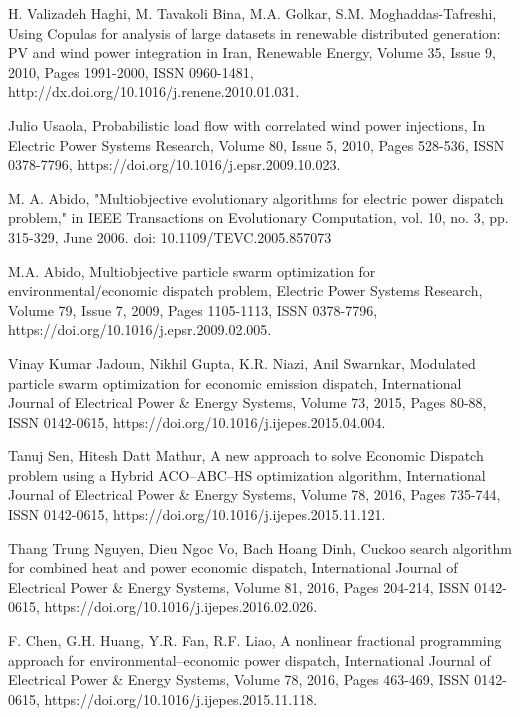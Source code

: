\begin{thebibliography}{99}
\begin{singlespace}
H. Valizadeh Haghi, M. Tavakoli Bina, M.A. Golkar, S.M. Moghaddas-Tafreshi, Using Copulas for analysis of large datasets in renewable distributed generation: PV and wind power integration in Iran, Renewable Energy, Volume 35, Issue 9, 2010, Pages 1991-2000, ISSN 0960-1481, http://dx.doi.org/10.1016/j.renene.2010.01.031.

Julio Usaola, Probabilistic load flow with correlated wind power injections, In Electric Power Systems Research, Volume 80, Issue 5, 2010, Pages 528-536, ISSN 0378-7796, https://doi.org/10.1016/j.epsr.2009.10.023.

 M. A. Abido, "Multiobjective evolutionary algorithms for electric power dispatch problem," in IEEE Transactions on Evolutionary Computation, vol. 10, no. 3, pp. 315-329, June 2006.
doi: 10.1109/TEVC.2005.857073

 M.A. Abido, Multiobjective particle swarm optimization for environmental/economic dispatch problem, Electric Power Systems Research, Volume 79, Issue 7, 2009, Pages 1105-1113, ISSN 0378-7796, https://doi.org/10.1016/j.epsr.2009.02.005.

 Vinay Kumar Jadoun, Nikhil Gupta, K.R. Niazi, Anil Swarnkar, Modulated particle swarm optimization for economic emission dispatch, International Journal of Electrical Power \& Energy Systems, Volume 73, 2015, Pages 80-88, ISSN 0142-0615, https://doi.org/10.1016/j.ijepes.2015.04.004.

Tanuj Sen, Hitesh Datt Mathur, A new approach to solve Economic Dispatch problem using a Hybrid ACO–ABC–HS optimization algorithm, International Journal of Electrical Power \& Energy Systems, Volume 78, 2016, Pages 735-744, ISSN 0142-0615, https://doi.org/10.1016/j.ijepes.2015.11.121.

 Thang Trung Nguyen, Dieu Ngoc Vo, Bach Hoang Dinh, Cuckoo search algorithm for combined heat and power economic dispatch, International Journal of Electrical Power \& Energy Systems, Volume 81, 2016, Pages 204-214, ISSN 0142-0615, https://doi.org/10.1016/j.ijepes.2016.02.026.

 F. Chen, G.H. Huang, Y.R. Fan, R.F. Liao, A nonlinear fractional programming approach for environmental–economic power dispatch, International Journal of Electrical Power \& Energy Systems, Volume 78, 2016, Pages 463-469, ISSN 0142-0615, https://doi.org/10.1016/j.ijepes.2015.11.118.


\end{singlespace}
\end{thebibliography}
